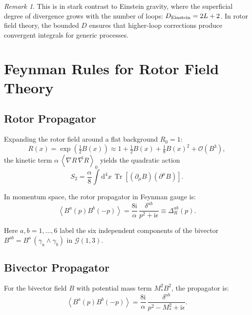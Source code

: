 \documentclass[11pt,a4paper]{article}
\numberwithin{equation}{section}
\theoremstyle{plain}
\theoremstyle{definition}
\theoremstyle{remark}
\newtheorem{remark}[theorem]{Remark}
\DeclareMathOperator{\Tr}{Tr}
\newcommand{\dd}{\mathrm{d}}
\newcommand{\ii}{\mathrm{i}}
\newcommand{\avg}[1]{\left\langle #1 \right\rangle}
\newcommand{\Cl}{\mathcal{G}}               %
\newcommand{\rev}[1]{\widetilde{#1}}        %
\newcommand{\grade}[2]{\left\langle #1 \right\rangle_{#2}}
\begin{document}
\begin{remark}
This is in stark contrast to Einstein gravity, where the superficial degree of divergence grows with the number of loops: $D_{\rm Einstein}=2L+2$. In rotor field theory, the bounded $D$ ensures that higher-loop corrections produce convergent integrals for generic processes.
\end{remark}

\vspace{1em}

\section{Feynman Rules for Rotor Field Theory}\label{sec:feynman}

\subsection{Rotor Propagator}

Expanding the rotor field around a flat background $R_0=1$:
\begin{equation}
R(x) = \exp\left(\tfrac12 B(x)\right) \approx 1 + \tfrac12 B(x) + \tfrac18 B(x)^2 + \mathcal{O}(B^3),
\label{eq:R-expansion}
\end{equation}
the kinetic term $\alpha\,\grade{\nabla R\,\rev{\nabla R}}{0}$ yields the quadratic action
\begin{equation}
S_2 = \frac{\alpha}{8}\int \dd^4x\,\Tr[(\partial_\mu B)(\partial^\mu B)].
\label{eq:S2-rotor}
\end{equation}

In momentum space, the rotor propagator in Feynman gauge is:
\begin{equation}
\avg{B^a(p)B^b(-p)} = \frac{8\ii}{\alpha}\,\frac{\delta^{ab}}{p^2+\ii\epsilon} \equiv \Delta_R^{ab}(p).
\label{eq:prop-rotor}
\end{equation}

Here $a,b=1,\ldots,6$ label the six independent components of the bivector $B^{ab}=B^a\,(\gamma_a\wedge\gamma_b)$ in $\Cl(1,3)$.

\subsection{Bivector Propagator}

For the bivector field $B$ with potential mass term $M_*^2 B^2$, the propagator is:
\begin{equation}
\avg{B^a(p)B^b(-p)} = \frac{8\ii}{\alpha}\,\frac{\delta^{ab}}{p^2 - M_*^2 + \ii\epsilon}.
\label{eq:prop-bivector}
\end{equation}
\end{document}
